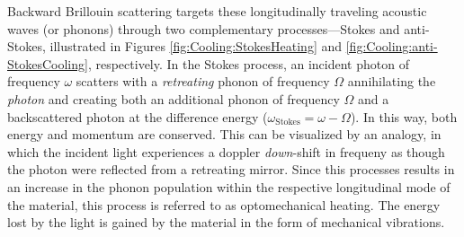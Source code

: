 Backward Brillouin scattering targets these longitudinally traveling acoustic waves (or phonons) through two complementary processes---Stokes and anti-Stokes, illustrated in Figures \ref{fig:Cooling:StokesHeating} and \ref{fig:Cooling:anti-StokesCooling}, respectively. In the Stokes process, an incident photon of frequency \(\omega\) scatters with a \textit{retreating} phonon of frequency \(\Omega\) annihilating the \textit{photon} and creating both an additional phonon of frequency \(\Omega\) and a backscattered photon at the difference energy (\(\omega_{\mathrm{Stokes}} = \omega - \Omega\)). In this way, both energy and momentum are conserved. This can be visualized by an analogy, in which the incident light experiences a doppler \textit{down}-shift in frequeny as though the photon were reflected from a retreating mirror. Since this processes results in an increase in the phonon population within the respective longitudinal mode of the material, this process is referred to as optomechanical heating. The energy lost by the light is gained by the material in the form of mechanical vibrations.

%

